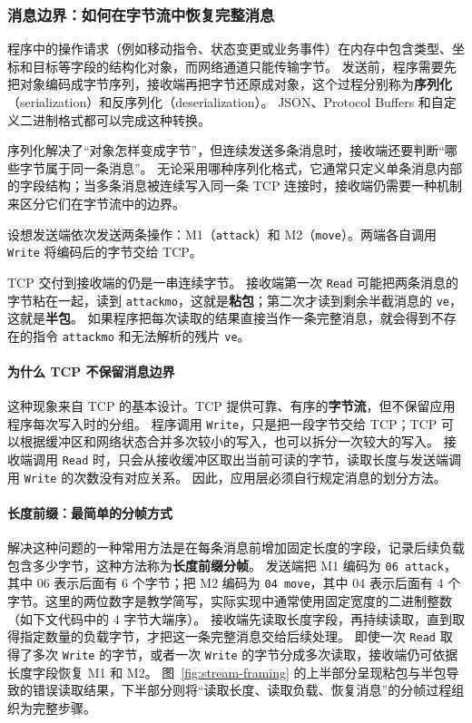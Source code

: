 \subsubsection{消息边界：如何在字节流中恢复完整消息}\label{sec2:tcp-framing}

程序中的操作请求（例如移动指令、状态变更或业务事件）在内存中包含类型、坐标和目标等字段的结构化对象，而网络通道只能传输字节。
发送前，程序需要先把对象编码成字节序列，接收端再把字节还原成对象，这个过程分别称为\textbf{序列化}（serialization）和反序列化（deserialization）。
JSON、Protocol Buffers 和自定义二进制格式都可以完成这种转换。

序列化解决了“对象怎样变成字节”，但连续发送多条消息时，接收端还要判断“哪些字节属于同一条消息”。
无论采用哪种序列化格式，它通常只定义单条消息内部的字段结构；当多条消息被连续写入同一条 TCP 连接时，接收端仍需要一种机制来区分它们在字节流中的边界。

设想发送端依次发送两条操作：M1（\texttt{attack}）和 M2（\texttt{move}）。两端各自调用 \texttt{Write} 将编码后的字节交给 TCP。

TCP 交付到接收端的仍是一串连续字节。
接收端第一次 \texttt{Read} 可能把两条消息的字节粘在一起，读到 \texttt{attackmo}，这就是\textbf{粘包}；第二次才读到剩余半截消息的 \texttt{ve}，这就是\textbf{半包}。
如果程序把每次读取的结果直接当作一条完整消息，就会得到不存在的指令 \texttt{attackmo} 和无法解析的残片 \texttt{ve}。

\paragraph{为什么 TCP 不保留消息边界}

这种现象来自 TCP 的基本设计。TCP 提供可靠、有序的\textbf{字节流}，但不保留应用程序每次写入时的分组。
程序调用 \texttt{Write}，只是把一段字节交给 TCP；TCP 可以根据缓冲区和网络状态合并多次较小的写入，也可以拆分一次较大的写入。
接收端调用 \texttt{Read} 时，只会从接收缓冲区取出当前可读的字节，读取长度与发送端调用 \texttt{Write} 的次数没有对应关系。
因此，应用层必须自行规定消息的划分方法。

\paragraph{长度前缀：最简单的分帧方式}

解决这种问题的一种常用方法是在每条消息前增加固定长度的字段，记录后续负载包含多少字节，这种方法称为\textbf{长度前缀分帧}。
发送端把 M1 编码为 \texttt{06 attack}，其中 06 表示后面有 6 个字节；把 M2 编码为 \texttt{04 move}，其中 04 表示后面有 4 个字节。这里的两位数字是教学简写，实际实现中通常使用固定宽度的二进制整数（如下文代码中的 4 字节大端序）。
接收端先读取长度字段，再持续读取，直到取得指定数量的负载字节，才把这一条完整消息交给后续处理。
即使一次 \texttt{Read} 取得了多次 \texttt{Write} 的字节，或者一次 \texttt{Write} 的字节分成多次读取，接收端仍可依据长度字段恢复 M1 和 M2。
图~\ref{fig:stream-framing} 的上半部分呈现粘包与半包导致的错误读取结果，下半部分则将“读取长度、读取负载、恢复消息”的分帧过程组织为完整步骤。

